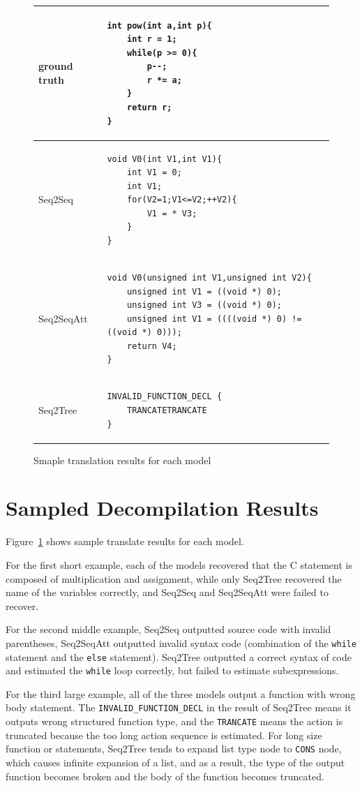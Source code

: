 \documentclass[senior,final,11pt]{iscs-thesis}
\begin{document}
\begin{figure}
\begin{tabular}{|l|l|}
	 ground truth & 
		\begin{lstlisting}[style=Csample]
int pow(int a,int p){
	int r = 1;
	while(p >= 0){
		p--;
		r *= a;
	}
	return r;
}
		\end{lstlisting} \\ \hline
		Seq2Seq & 
		\begin{lstlisting}[style=Csample]
void V0(int V1,int V1){ 
	int V1 = 0; 
	int V1; 
	for(V2=1;V1<=V2;++V2){ 
		V1 = * V3; 
	} 
}
		\end{lstlisting} \\ \hline
		Seq2SeqAtt & 
		\begin{lstlisting}[style=Csample]
void V0(unsigned int V1,unsigned int V2){ 
	unsigned int V1 = ((void *) 0); 
	unsigned int V3 = ((void *) 0); 
	unsigned int V1 = ((((void *) 0) != ((void *) 0))); 
	return V4; 
}
	\end{lstlisting} \\ \hline
		Seq2Tree & 
		\begin{lstlisting}[style=Csample]
INVALID_FUNCTION_DECL { 
	TRANCATETRANCATE 
}
		\end{lstlisting}
		 \\ \hline	
	\end{tabular}
	\caption{Smaple translation results for each model}
	\label{fig:sampletranse}
\end{figure}


\section{Sampled Decompilation Results}

Figure~\ref{fig:sampletranse} shows sample translate results for each model.

For the first short example, each of the models recovered that the C statement is composed of multiplication and assignment,
while only Seq2Tree recovered the name of the variables correctly, and Seq2Seq and Seq2SeqAtt were failed to recover.

For the second middle example, Seq2Seq outputted source code with invalid parentheses, Seq2SeqAtt outputted invalid syntax code (combination of the \texttt{while} statement and the \texttt{else} statement).
Seq2Tree outputted a correct syntax of code and estimated the \texttt{while} loop correctly, but failed to estimate subexpressions.

For the third large example, all of the three models output a function with wrong body statement.
The \texttt{INVALID\_FUNCTION\_DECL} in the result of Seq2Tree means it outputs wrong structured function type, and the \texttt{TRANCATE} means 
the action is truncated because the too long action sequence is estimated. 
For long size function or statements, Seq2Tree tends to expand list type node to \texttt{CONS} node, which causes infinite expansion of a list,
and as a result, the type of the output function becomes broken and the body of the function becomes truncated.
\end{document}
